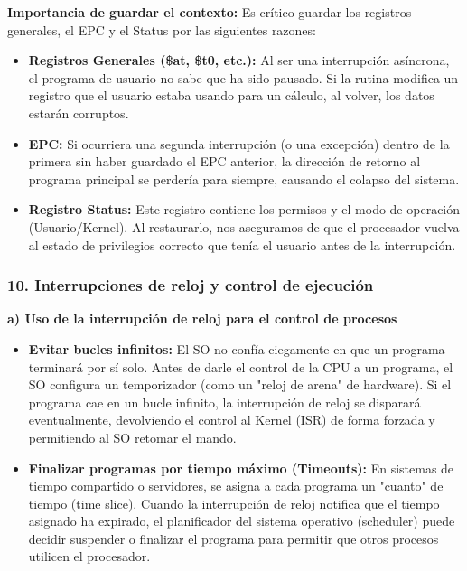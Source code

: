 \documentclass[12pt,a4paper]{article}
\begin{document}
\textbf{Importancia de guardar el contexto:} Es crítico guardar los registros generales, el EPC y el Status por las siguientes razones:
\begin{itemize}
    \item \textbf{Registros Generales (\$at, \$t0, etc.):} Al ser una interrupción asíncrona, el programa de usuario no sabe que ha sido pausado. Si la rutina modifica un registro que el usuario estaba usando para un cálculo, al volver, los datos estarán corruptos.
    \item \textbf{EPC:} Si ocurriera una segunda interrupción (o una excepción) dentro de la primera sin haber guardado el EPC anterior, la dirección de retorno al programa principal se perdería para siempre, causando el colapso del sistema.
    \item \textbf{Registro Status:} Este registro contiene los permisos y el modo de operación (Usuario/Kernel). Al restaurarlo, nos aseguramos de que el procesador vuelva al estado de privilegios correcto que tenía el usuario antes de la interrupción.
\end{itemize}

\subsubsection{10. Interrupciones de reloj y control de ejecución}

\textbf{a) Uso de la interrupción de reloj para el control de procesos}
\begin{itemize}
    \item \textbf{Evitar bucles infinitos:} El SO no confía ciegamente en que un programa terminará por sí solo. Antes de darle el control de la CPU a un programa, el SO configura un temporizador (como un "reloj de arena" de hardware). Si el programa cae en un bucle infinito, la interrupción de reloj se disparará eventualmente, devolviendo el control al Kernel (ISR) de forma forzada y permitiendo al SO retomar el mando.
    \item \textbf{Finalizar programas por tiempo máximo (Timeouts):} En sistemas de tiempo compartido o servidores, se asigna a cada programa un "cuanto" de tiempo (time slice). Cuando la interrupción de reloj notifica que el tiempo asignado ha expirado, el planificador del sistema operativo (scheduler) puede decidir suspender o finalizar el programa para permitir que otros procesos utilicen el procesador.
\end{itemize}
\end{document}
